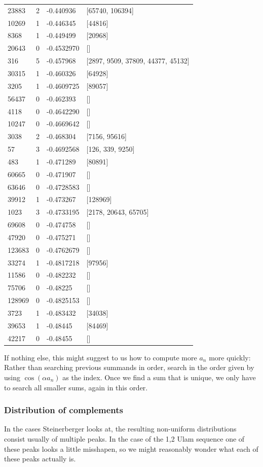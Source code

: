 \documentclass{article}
\theoremstyle{definition}
\theoremstyle{remark}
\numberwithin{equation}{section}
\begin{document}
{\begin{tabular}{llll}
23883 & 2 & -0.440936 & [65740, 106394]\\
10269 & 1 & -0.446345 & [44816]\\
8368 & 1 & -0.449499 & [20968]\\
20643 & 0 & -0.4532970 & []\\
316 & 5 & -0.457968 & [2897, 9509, 37809, 44377, 45132]\\
30315 & 1 & -0.460326 & [64928]\\
3205 & 1 & -0.4609725 & [89057]\\
56437 & 0 & -0.462393 & []\\
4118 & 0 & -0.4642290 & []\\
10247 & 0 & -0.4669642 & []\\
3038 & 2 & -0.468304 & [7156, 95616]\\
57 & 3 & -0.4692568 & [126, 339, 9250]\\
483 & 1 & -0.471289 & [80891]\\
60665 & 0 & -0.471907 & []\\
63646 & 0 & -0.4728583 & []\\
39912 & 1 & -0.473267 & [128969]\\
1023 & 3 & -0.4733195 & [2178, 20643, 65705]\\
69608 & 0 & -0.474758 & []\\
47920 & 0 & -0.475271 & []\\
123683 & 0 & -0.4762679 & []\\
33274 & 1 & -0.4817218 & [97956]\\
11586 & 0 & -0.482232 & []\\
75706 & 0 & -0.48225 & []\\
128969 & 0 & -0.4825153 & []\\
3723 & 1 & -0.483432 & [34038]\\
39653 & 1 & -0.48445 & [84469]\\
42217 & 0 & -0.48455 & []
\end{tabular}

If nothing else, this might suggest to us how to compute more $a_n$ more
quickly: Rather than searching previous summands in order, search in
the order given by using $\cos(\alpha a_n)$ as the index.  Once we find a
sum that is unique, we only have to search all smaller sums, again in
this order.  

\subsubsection{Distribution of complements}
In the cases Steinerberger looks at, the resulting non-uniform
distributions consist usually of multiple peaks.  In the case of the
1,2 Ulam sequence one of these peaks looks a little misshapen, so we
might reasonably wonder what each of these peaks actually is.

}
\end{document}
